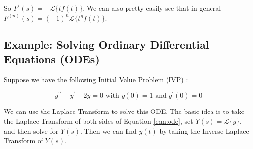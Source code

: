 \documentclass{article}
\theoremstyle{definition}
\begin{document}
\bigskip
\noindent
So $F^\prime(s) = -\mathcal{L}\{tf(t)\}$. We can also pretty easily see that in general $F^{(n)}(s) = (-1)^n \mathcal{L}\{t^n f(t)\}$.

\bigskip
\subsection{Example: Solving Ordinary Differential Equations (ODEs)}
\label{sec:example_ode}
\bigskip
\noindent
Suppose we have the following Initial Value Problem (IVP)  \cite{wiki:initial_value_problem}:

\smallskip
\begin{equation}
y^{\prime \prime} - y^\prime -2y = 0 \text{ with $y(0) = 1$ and $y^\prime (0) = 0$}
\label{eqn:ode}
\end{equation}

\bigskip
\noindent
We can use the Laplace Transform to solve this ODE. The basic idea is to take the Laplace Transform of both sides of Equation \ref{eqn:ode}, set $Y(s) = \mathcal{L}\{y\}$,
and then solve for $Y(s)$. Then we can find $y(t)$ by taking the Inverse Laplace Transform of $Y(s)$.
\end{document}
